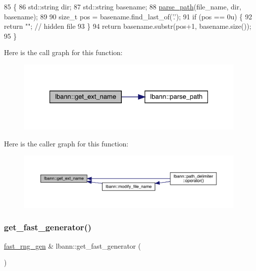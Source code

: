 \begin{DoxyCode}
85                                                   \{
86   std::string dir;
87   std::string basename;
88   \hyperlink{namespacelbann_a1ce6832a54235a5fb333f50fffbe1b63}{parse\_path}(file\_name, dir, basename);
89 
90   \textcolor{keywordtype}{size\_t} pos = basename.find\_last\_of(\textcolor{charliteral}{'.'});
91   \textcolor{keywordflow}{if} (pos == 0u) \{
92     \textcolor{keywordflow}{return} \textcolor{stringliteral}{""};  \textcolor{comment}{// hidden file}
93   \}
94   \textcolor{keywordflow}{return} basename.substr(pos+1, basename.size());
95 \}
\end{DoxyCode}
Here is the call graph for this function\+:\nopagebreak
\begin{figure}[H]
\begin{center}
\leavevmode
\includegraphics[width=321pt]{namespacelbann_ad9a28639b0953886bbcb7fc366783a17_cgraph}
\end{center}
\end{figure}
Here is the caller graph for this function\+:\nopagebreak
\begin{figure}[H]
\begin{center}
\leavevmode
\includegraphics[width=350pt]{namespacelbann_ad9a28639b0953886bbcb7fc366783a17_icgraph}
\end{center}
\end{figure}
\mbox{\label{namespacelbann_ae6ce9c2fdec6f81803f6b1a6555c31c5}} 
\subsubsection{\texorpdfstring{get\+\_\+fast\+\_\+generator()}{get\_fast\_generator()}}
{\footnotesize\ttfamily \hyperlink{namespacelbann_af16616ffa6a3616836eabadd6ce837ec}{fast\+\_\+rng\+\_\+gen} \& lbann\+::get\+\_\+fast\+\_\+generator (\begin{DoxyParamCaption}{ }\end{DoxyParamCaption})}

